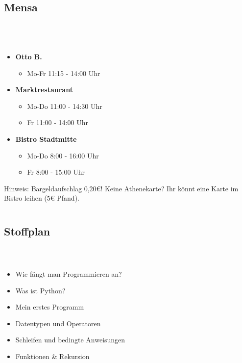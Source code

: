 \subsection{Mensa}
\begin{frame}
	\frametitle{\insertsectionhead \\ {\small \insertsubsectionhead}}
	\begin{columns}
		\begin{column}{5cm}
			\begin{itemize}
				\item \textbf{Otto B.}
				\begin{itemize}
					\item Mo-Fr 11:15 - 14:00 Uhr
				\end{itemize}
				\item \textbf{Marktrestaurant}
				\begin{itemize}
					\item Mo-Do 11:00 - 14:30 Uhr
					\item Fr 11:00 - 14:00 Uhr
				\end{itemize}
				\item \textbf{Bistro Stadtmitte }
				\begin{itemize}
					\item Mo-Do 8:00 - 16:00 Uhr
					\item Fr 8:00 - 15:00 Uhr
				\end{itemize}
			\end{itemize}
			\begin{block}{Hinweis:}
				Bargeldaufschlag 0,20€! Keine Athenekarte? Ihr könnt eine Karte im Bistro leihen (5€ Pfand).
			\end{block}
		\end{column}
		\begin{column}{7.2cm}
			\vspace{-2.5ex}
		\end{column}
	\end{columns}
\end{frame}


\subsection{Stoffplan}
\begin{frame}
	\frametitle{\insertsectionhead \\ {\small \insertsubsectionhead}}
	\begin{itemize}
		\item Wie fängt man Programmieren an?
		\item Was ist Python?
		\item Mein erstes Programm
		\item Datentypen und Operatoren
		\item Schleifen und bedingte Anweisungen
		\item Funktionen \& Rekursion
	\end{itemize}
\end{frame}

